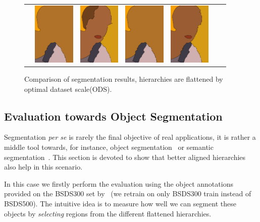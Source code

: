 \begin{figure}[tb]
\begin{center}
\begin{tabular}{ c  c  c  c  c  c  c }
&\includegraphics[width=2cm]{fig/visual_result/visual_result_6_4.png}
&\includegraphics[width=2cm]{fig/visual_result/visual_result_6_5.png}
&\includegraphics[width=2cm]{fig/visual_result/visual_result_6_6.png}
&\includegraphics[width=2cm]{fig/visual_result/visual_result_6_7.png}
\\
\end{tabular}
\end{center}
\caption{Comparison of segmentation results, hierarchies are flattened by optimal dataset scale(ODS).}
\label{fig:visual_result}
\end{figure}


\subsection{Evaluation towards Object Segmentation}
Segmentation \textit{per se} is rarely the final objective of real
applications, it is rather a middle tool towards, for instance, object
segmentation~\cite{arbelaez2014multiscale} or semantic
segmentation~\cite{Lempitsky2011}.  This section is devoted to show
that better aligned hierarchies also help in this scenario.

In this case we firstly perform the evaluation using the object annotations
provided on the BSDS300 set by~\cite{Endres2014} (we retrain on only BSDS300 train instead of BSDS500).
The intuitive idea is to measure how well we can segment these objects by
\textit{selecting} regions from the different flattened hierarchies.

